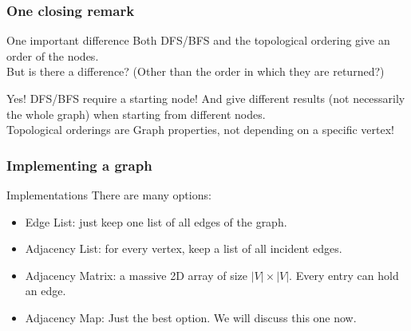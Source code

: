 \begin{frame}
	\frametitle{One closing remark}
	
		\begin{block}{One important difference}
			Both DFS/BFS and the topological ordering give an order of the nodes.\\
			\pause
			But is there a difference? (Other than the order in which they are returned?)
		\end{block}	

		\pause
		\begin{block}{Yes!}
			DFS/BFS require a starting node! And give different results (not necessarily the whole graph) when starting from
			different nodes.\\
			\pause
			Topological orderings are Graph properties, not depending on a specific vertex!
		\end{block}
\end{frame}

\begin{frame}
	\frametitle{Implementing a graph}

	\begin{block}{Implementations}
		There are many options:
		\begin{itemize}
			\item Edge List: just keep one list of all edges of the graph.
				\pause
			\item Adjacency List: for every vertex, keep a list of all incident edges.
				\pause
			\item Adjacency Matrix: a massive 2D array of size $|V|\times |V|$. Every entry can hold an edge.
				\pause
			\item Adjacency Map: Just the best option. We will discuss this one now.
		\end{itemize}
	\end{block}	
\end{frame}

